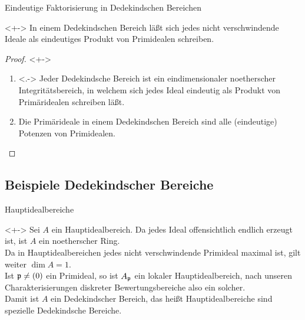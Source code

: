 \begin{frame}{Eindeutige Faktorisierung in Dedekindschen Bereichen}
	\begin{corollary}<+->
		In einem Dedekindschen Bereich läßt sich jedes nicht verschwindende Ideale als
		eindeutiges Produkt von Primidealen schreiben.
	\end{corollary}
	\begin{proof}<+->
		\begin{enumerate}[<+->]
		\item<.->
			Jeder Dedekindsche Bereich ist ein eindimensionaler noetherscher Integritätsbereich,
			in welchem sich jedes Ideal eindeutig als Produkt von Primäridealen schreiben läßt.
		\item
			Die Primärideale in einem Dedekindschen Bereich sind alle (eindeutige) Potenzen von Primidealen.
			\qedhere
		\end{enumerate}
	\end{proof}
\end{frame}

\subsection{Beispiele Dedekindscher Bereiche}

\begin{frame}{Hauptidealbereiche}
	\begin{example}<+->
		Sei \(A\) ein Hauptidealbereich. Da jedes Ideal offensichtlich
		endlich erzeugt ist, ist \(A\) ein noetherscher Ring.
		\\
		Da in Hauptidealbereichen jedes nicht verschwindende Primideal maximal
		ist, gilt weiter \(\dim A = 1\).
		\\
		Ist \(\mathfrak{p} \neq (0)\) ein Primideal, so ist \(A_{\mathfrak{p}}\)
		ein lokaler Hauptidealbereich, nach unseren Charakterisierungen
		diskreter Bewertungsbereiche also ein solcher.
		\\
		Damit ist \(A\) ein Dedekindscher Bereich, das heißt Hauptidealbereiche
		sind spezielle Dedekindsche Bereiche.
	\end{example}
\end{frame}


